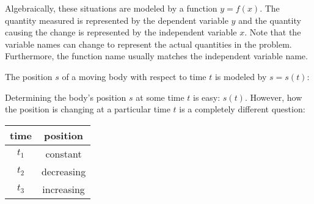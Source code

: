 \documentclass[letterpaper,12pt,fleqn]{article}
\begin{document}
\bigskip

Algebraically, these situations are modeled by a function \(y=f(x)\).  The quantity measured is represented by the
dependent variable \(y\) and the quantity causing the change is represented by the independent variable \(x\).
Note that the variable names can change to represent the actual quantities in the problem.  Furthermore, the
function name usually matches the independent variable name.

\begin{example}

  The position \(s\) of a moving body with respect to time \(t\) is modeled by \(s=s(t)\):

  \bigskip

  \begin{center}
  \end{center}

  Determining the body's position \(s\) at some time \(t\) is easy: \(s(t)\).  However, how the position is
  changing at a particular time \(t\) is a completely different question:

  \bigskip

  \begin{center}
    \begin{tabular}{|c|c|}
      \hline
      time & position \\
      \hline
      \hline
      \(t_1\) & constant \\
      \hline
      \(t_2\) & decreasing \\
      \hline
      \(t_3\) & increasing \\
      \hline
    \end{tabular}
  \end{center}
\end{example}
\end{document}
